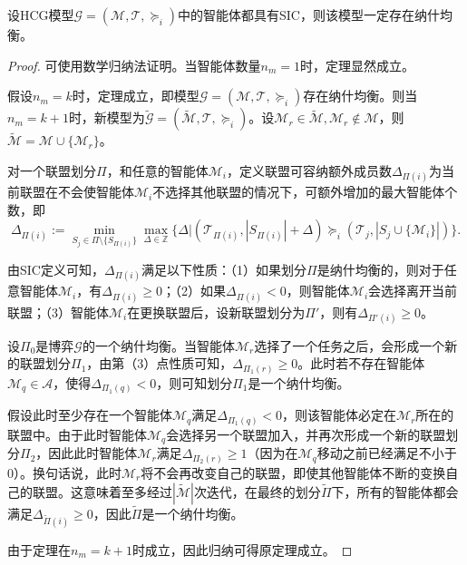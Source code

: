 \begin{theorem}
	设HCG模型$\mathcal{G}=(\mathcal{M},\mathcal{T},\succeq_i)$中的智能体都具有SIC，则该模型一定存在纳什均衡。
	\begin{proof}
		可使用数学归纳法证明。当智能体数量$n_m=1$时，定理显然成立。
		
		假设$n_m=k$时，定理成立，即模型$\mathcal{G}=(\mathcal{M},\mathcal{T},\succeq_i)$存在纳什均衡。则当$n_m=k+1$时，新模型为$\widetilde{\mathcal{G}}=(\widetilde{\mathcal{M}},\mathcal{T},\succeq_i)$。设$\mathcal{M}_r \in \widetilde{\mathcal{M}}, \mathcal{M}_r \notin \mathcal{M}$，则$\widetilde{\mathcal{M}}=\mathcal{M} \cup \{\mathcal{M}_r\}$。
		
		对一个联盟划分$\Pi$，和任意的智能体$\mathcal{M}_i$，定义联盟可容纳额外成员数$\Delta_{\Pi(i)}$为当前联盟在不会使智能体$\mathcal{M}_i$不选择其他联盟的情况下，可额外增加的最大智能体个数，即
		\begin{equation}
		\label{hcg:eq:maxDelta}
			\Delta_{\Pi(i)}:= \min_{S_j \in \Pi \setminus \{S_{\Pi(i)}\}} \max_{\Delta \in \mathbb{Z}}\{\Delta|(\mathcal{T}_{\Pi(i)},|S_{\Pi(i)}|+\Delta) \succeq_i (\mathcal{T}_j, |S_j \cup \{\mathcal{M}_i\}|) \}.
		\end{equation}
		
		由SIC定义可知，$\Delta_{\Pi(i)}$满足以下性质：（1）如果划分$\Pi$是纳什均衡的，则对于任意智能体$\mathcal{M}_i$，有$\Delta_{\Pi(i)}\geq 0$；（2）如果$\Delta_{\Pi(i)}<0$，则智能体$\mathcal{M}_i$会选择离开当前联盟；（3）智能体$\mathcal{M}_i$在更换联盟后，设新联盟划分为$\Pi'$，则有$\Delta_{\Pi'(i)} \geq 0$。
		
		设$\Pi_0$是博弈$\mathcal{G}$的一个纳什均衡。当智能体$\mathcal{M}_r$选择了一个任务之后，会形成一个新的联盟划分$\Pi_1$，由第（3）点性质可知，$\Delta_{\Pi_1(r)}\geq 0$。此时若不存在智能体$\mathcal{M}_q \in \mathcal{A}$，使得$\Delta_{\Pi_1(q)}<0$，则可知划分$\Pi_1$是一个纳什均衡。
		
		假设此时至少存在一个智能体$\mathcal{M}_q$满足$\Delta_{\Pi_1(q)}<0$，则该智能体必定在$\mathcal{M}_r$所在的联盟中。由于此时智能体$\mathcal{M}_q$会选择另一个联盟加入，并再次形成一个新的联盟划分$\Pi_2$，因此此时智能体$\mathcal{M}_r$满足$\Delta_{\Pi_2(r)} \geq 1$（因为在$\mathcal{M}_q$移动之前已经满足不小于0）。换句话说，此时$\mathcal{M}_r$将不会再改变自己的联盟，即使其他智能体不断的变换自己的联盟。这意味着至多经过$|\widetilde{\mathcal{M}}|$次迭代，在最终的划分$\widetilde{\Pi}$下，所有的智能体都会满足$\Delta_{\widetilde{\Pi}(i)}\geq 0$，因此$\widetilde{\Pi}$是一个纳什均衡。
		
		由于定理在$n_m=k+1$时成立，因此归纳可得原定理成立。
	\end{proof}
\end{theorem}

